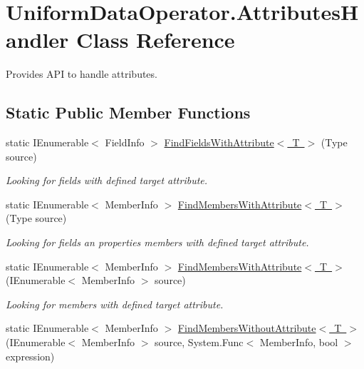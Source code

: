 \hypertarget{class_uniform_data_operator_1_1_attributes_handler}{}\section{Uniform\+Data\+Operator.\+Attributes\+Handler Class Reference}
\label{class_uniform_data_operator_1_1_attributes_handler}


Provides A\+PI to handle attributes.  


\subsection*{Static Public Member Functions}
\begin{DoxyCompactItemize}
\item 
static I\+Enumerable$<$ Field\+Info $>$ \mbox{\hyperlink{class_uniform_data_operator_1_1_attributes_handler_a075ceb8dabe05f15f7bd0bd4b1517c80}{Find\+Fields\+With\+Attribute$<$ T $>$}} (Type source)
\begin{DoxyCompactList}\small\item\em Looking for fields with defined target attribute. \end{DoxyCompactList}\item 
static I\+Enumerable$<$ Member\+Info $>$ \mbox{\hyperlink{class_uniform_data_operator_1_1_attributes_handler_af629ef53b40e2b73b2e8fb5dafd1239d}{Find\+Members\+With\+Attribute$<$ T $>$}} (Type source)
\begin{DoxyCompactList}\small\item\em Looking for fields an properties members with defined target attribute. \end{DoxyCompactList}\item 
static I\+Enumerable$<$ Member\+Info $>$ \mbox{\hyperlink{class_uniform_data_operator_1_1_attributes_handler_a5e4058aa0ace67c90606d7974690cafe}{Find\+Members\+With\+Attribute$<$ T $>$}} (I\+Enumerable$<$ Member\+Info $>$ source)
\begin{DoxyCompactList}\small\item\em Looking for members with defined target attribute. \end{DoxyCompactList}\item 
static I\+Enumerable$<$ Member\+Info $>$ \mbox{\hyperlink{class_uniform_data_operator_1_1_attributes_handler_abf0519ca2624a4c03b894e5b5cd2c594}{Find\+Members\+Without\+Attribute$<$ T $>$}} (I\+Enumerable$<$ Member\+Info $>$ source, System.\+Func$<$ Member\+Info, bool $>$ expression)

\end{DoxyCompactItemize}
